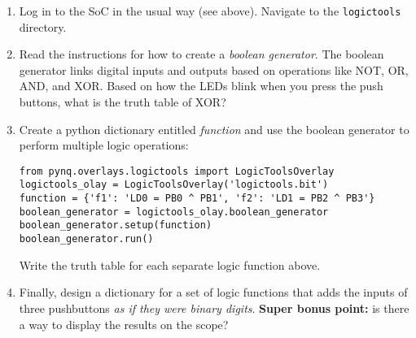 \documentclass{article}
\begin{document}
\begin{enumerate}
\item Log in to the SoC in the usual way (see above).  Navigate to the \verb+logictools+ directory.
\item Read the instructions for how to create a \textit{boolean generator}.  The boolean generator links digital inputs and outputs based on operations like NOT, OR, AND, and XOR.  Based on how the LEDs blink when you press the push buttons, what is the truth table of XOR? \\ \vspace{2cm}
\item Create a python dictionary entitled \textit{function} and use the boolean generator to perform multiple logic operations:
\begin{verbatim}
from pynq.overlays.logictools import LogicToolsOverlay
logictools_olay = LogicToolsOverlay('logictools.bit')
function = {'f1': 'LD0 = PB0 ^ PB1', 'f2': 'LD1 = PB2 ^ PB3'}
boolean_generator = logictools_olay.boolean_generator
boolean_generator.setup(function)
boolean_generator.run()
\end{verbatim}
Write the truth table for each separate logic function above. \\ \vspace{0.5cm}
\item Finally, design a dictionary for a set of logic functions that adds the inputs of three pushbuttons \textit{as if they were binary digits}. \textbf{Super bonus point:} is there a way to display the results on the scope?
\end{enumerate}
\end{document}
